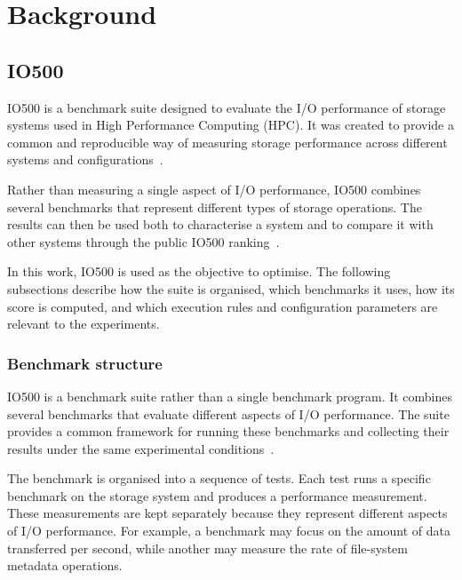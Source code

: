 \section{Background}



\subsection{IO500}

IO500 is a benchmark suite designed to evaluate the I/O performance of
storage systems used in High Performance Computing (HPC). It was created
to provide a common and reproducible way of measuring storage performance
across different systems and configurations~\cite{io500about}.

Rather than measuring a single aspect of I/O performance, IO500 combines
several benchmarks that represent different types of storage operations.
The results can then be used both to characterise a system and to compare
it with other systems through the public IO500 ranking~\cite{io500list}.

In this work, IO500 is used as the objective to optimise. The following
subsections describe how the suite is organised, which benchmarks it uses,
how its score is computed, and which execution rules and configuration
parameters are relevant to the experiments.

\subsubsection{Benchmark structure}

IO500 is a benchmark suite rather than a single benchmark program. It
combines several benchmarks that evaluate different aspects of I/O
performance. The suite provides a common framework for running these
benchmarks and collecting their results under the same experimental
conditions~\cite{io500about}.

The benchmark is organised into a sequence of tests. Each test runs a
specific benchmark on the storage system and produces a performance
measurement. These measurements are kept separately because they
represent different aspects of I/O performance. For example, a benchmark
may focus on the amount of data transferred per second, while another
may measure the rate of file-system metadata operations.

